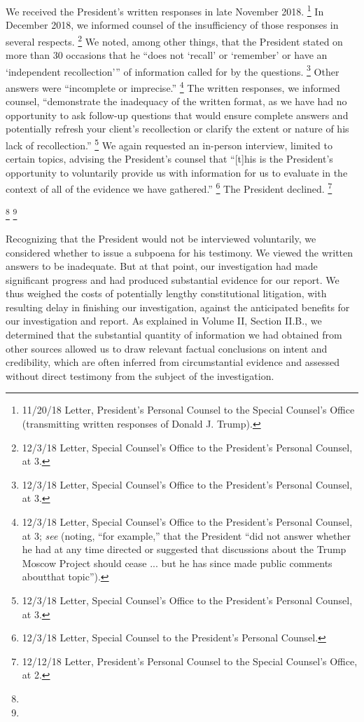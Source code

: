 We received the President’s written responses in late November 2018.%
\footnote{11/20/18 Letter, President’s Personal Counsel to the Special Counsel’s Office (transmitting written responses of Donald J. Trump).}
In December 2018, we informed counsel of the insufficiency of those responses in several respects.%
\footnote{12/3/18 Letter, Special Counsel’s Office to the President’s Personal Counsel, at 3.}
We noted, among other things, that the President stated on more than 30 occasions that he “does not ‘recall’ or ‘remember’ or have an ‘independent recollection’” of information called for by the questions.%
\footnote{12/3/18 Letter, Special Counsel’s Office to the President’s Personal Counsel, at 3.}
Other answers were “incomplete or imprecise.”%
\footnote{12/3/18 Letter, Special Counsel’s Office to the President’s Personal Counsel, at 3;
\textit{see} (noting, “for example,” that the President “did not answer whether he had at any time directed or suggested that discussions about the Trump Moscow Project should cease ... but he has since made public comments aboutthat topic”).}
The written responses, we informed counsel, “demonstrate the inadequacy of the written format, as we have had no opportunity to ask follow-up questions that would ensure complete answers and potentially refresh your client’s recollection or clarify the extent or nature of his lack of recollection.”%
\footnote{12/3/18 Letter, Special Counsel’s Office to the President’s Personal Counsel, at 3.}
We again requested an in-person interview, limited to certain topics, advising the President’s counsel that “[t]his is the President’s opportunity to voluntarily provide us with information for us to evaluate in the context of all of the evidence we have gathered.”%
\footnote{12/3/18 Letter, Special Counsel to the President’s Personal Counsel.}
The President declined.%
\footnote{12/12/18 Letter, President’s Personal Counsel to the Special Counsel’s Office, at 2.}

\footnote{}
\footnote{}

Recognizing that the President would not be interviewed voluntarily, we considered whether to issue a subpoena for his testimony.
We viewed the written answers to be inadequate.
But at that point, our investigation had made significant progress and had produced substantial evidence for our report.
We thus weighed the costs of potentially lengthy constitutional litigation, with resulting delay in finishing our investigation, against the anticipated benefits for our investigation and report.
As explained in Volume II, Section II.B., we determined that the substantial quantity of information we had obtained from other sources allowed us to draw relevant factual conclusions on intent and credibility, which are often inferred from circumstantial evidence and assessed without direct testimony from the subject of the investigation.

